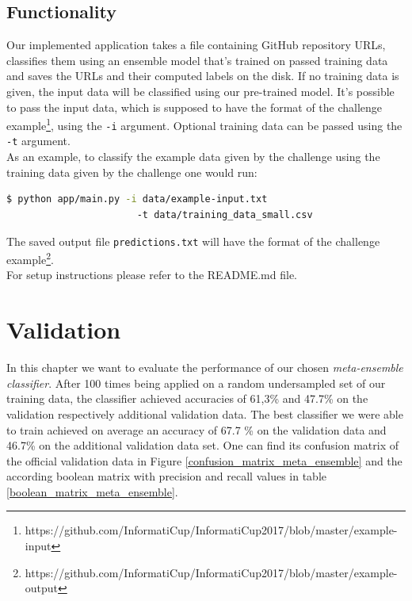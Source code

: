 \documentclass[%
a4paper,
DIV12,
2.5headlines,
bigheadings,
titlepage,
openbib,
]{scrartcl}
\begin{document}
\subsection{Functionality}\label{functionality}

Our implemented application takes a file containing GitHub repository URLs, classifies them using an ensemble model that's trained on passed training data and saves the URLs and their computed labels on the disk.
If no training data is given, the input data will be classified using our pre-trained model.
It's possible to pass the input data, which is supposed to have the format of the challenge example\footnote{https://github.com/InformatiCup/InformatiCup2017/blob/master/example-input}, using the \texttt{-i} argument.
Optional training data can be passed using the \texttt{-t} argument.\\
As an example, to classify the example data given by the challenge using the training data given by the challenge one would run:

\begin{lstlisting}[language=bash]
  $ python app/main.py -i data/example-input.txt
                       -t data/training_data_small.csv
\end{lstlisting}

The saved output file \texttt{predictions.txt} will have the format of the challenge example\footnote{https://github.com/InformatiCup/InformatiCup2017/blob/master/example-output}.\\
For setup instructions please refer to the README.md file.

\section{Validation}\label{validation}

In this chapter we want to evaluate the performance of our chosen \textit{meta-ensemble classifier}.
After 100 times being applied on a random undersampled set of our training data, the classifier achieved accuracies of 61,3\% and 47.7\% on the validation respectively additional validation data.
The best classifier we were able to train achieved on average an accuracy of 67.7 \% on the validation data and 46.7\% on the additional validation data set.
One can find its confusion matrix of the official validation data in Figure \ref{confusion_matrix_meta_ensemble} and the according boolean matrix with precision and recall values in table \ref{boolean_matrix_meta_ensemble}.
\end{document}
